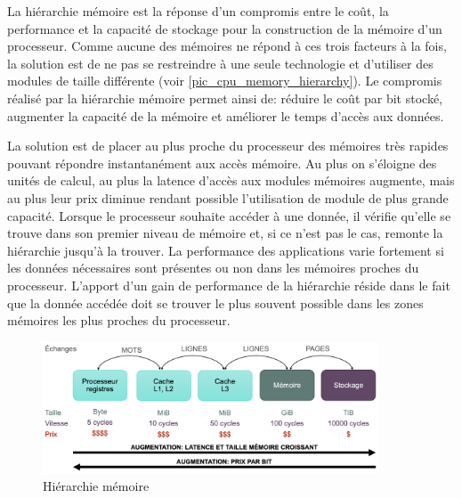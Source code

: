 La hiérarchie mémoire est la réponse d'un compromis entre le coût, la performance et la capacité de stockage pour la construction de la mémoire d'un processeur. Comme aucune des mémoires ne répond à ces trois facteurs à la fois, la solution est de ne pas se restreindre à  une seule technologie et d'utiliser des modules de taille différente (voir \autoref{pic_cpu_memory_hierarchy}). Le compromis réalisé par la hiérarchie mémoire permet ainsi de: réduire le coût par bit stocké, augmenter la capacité de la mémoire et améliorer le temps d'accès aux données. 

La solution est de placer au plus proche du processeur des mémoires très rapides pouvant répondre instantanément aux accès mémoire. Au plus on s'éloigne des unités de calcul, au plus la latence d'accès aux modules mémoires augmente, mais au plus leur prix diminue rendant possible l'utilisation de module de plus grande capacité. Lorsque le processeur souhaite accéder à une donnée, il vérifie qu'elle se trouve dans son premier niveau de mémoire et, si ce n'est pas le cas, remonte la hiérarchie jusqu'à la trouver. La performance des applications varie fortement si les données nécessaires sont présentes ou non dans les mémoires proches du processeur. L'apport d'un gain de performance de la hiérarchie réside dans le fait que la donnée accédée doit se trouver le plus souvent possible dans les zones mémoires les plus proches du processeur.


\begin{figure}
    \center
    \includegraphics[width=10cm]{images/cpu_memory_hierarchy.png}
    \caption{\label{pic_cpu_memory_hierarchy} Hiérarchie mémoire}
\end{figure}


